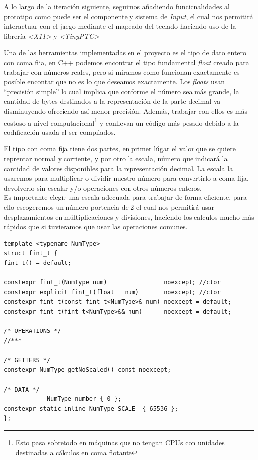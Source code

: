 A lo largo de la iteración siguiente, seguimos añadiendo funcionalidades al prototipo como puede 
ser el componente y sistema de \textit{Input}, el cual nos permitirá interactuar con el juego
mediante el mapeado del teclado haciendo uso de la librería \textit{\textless X11\textgreater}
y \textit{\textless TinyPTC\textgreater}

Una de las herramientas implementadas en el proyecto es el tipo de dato entero con coma fija,
en C++ podemos encontrar el tipo fundamental \textit{float} creado para trabajar con números 
reales, pero si miramos como funcionan exactamente es posible encontar que no es lo que deseamos
exactamente. Los \textit{floats} usan ``precisión simple'' lo cual implica que conforme el número 
sea más grande, la cantidad de bytes destinados a la representación de la parte decimal va 
disminuyendo ofreciendo así menor precisión. Además, trabajar con ellos es más costoso a nivel
computacional\footnote{Esto pasa sobretodo en máquinas que no tengan CPUs con unidades destinadas 
a cálculos en coma flotante} y conllevan un código más pesado debido a la codificación usada 
al ser compilados.

El tipo con coma fija tiene dos partes, en primer lúgar el valor que se quiere reprentar normal
y corriente, y por otro la escala, número que indicará la cantidad de valores disponibles
para la representación decimal. La escala la usaremos para multiplicar o dividir nuestro número
para convertirlo a coma fija, devolverlo sin escalar y/o operaciones con otros números enteros.\\
Es importante elegir una escala adecuada para trabajar de forma eficiente, para ello escogeremos
un número portencia de 2 el cual nos permitirá usar desplazamientos en múltiplicaciones y divisiones,
hacíendo los calculos mucho más rápidos que si tuvieramos que usar las operaciones comunes.

\begin{lstlisting}[style=CodigoC++, caption={Entero coma fija},label=fint_t]
template <typename NumType>
struct fint_t {
fint_t() = default;

constexpr fint_t(NumType num)                noexcept; //ctor
constexpr explicit fint_t(float   num)       noexcept; //ctor
constexpr fint_t(const fint_t<NumType>& num) noexcept = default; 
constexpr fint_t(fint_t<NumType>&& num)      noexcept = default;

/* OPERATIONS */
//***

/* GETTERS */
constexpr NumType getNoScaled() const noexcept;

/* DATA */    
			NumType number { 0 };
constexpr static inline NumType SCALE  { 65536 };
};
\end{lstlisting}

